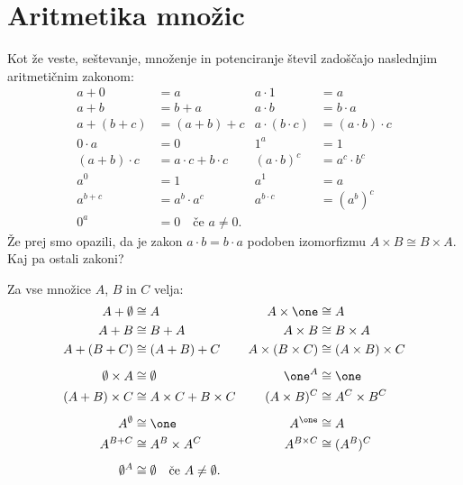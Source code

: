 
\section{Aritmetika množic}
\label{sec:aritmetika-mnozic}

Kot že veste, seštevanje, množenje in potenciranje števil zadoščajo naslednjim
aritmetičnim zakonom:
%
\begin{align*}
  a + 0 &= a                   &     a \cdot 1 &= a \\
  a + b &= b + a               &     a \cdot b &= b \cdot a \\
  a + (b + c) &= (a + b) + c   &     a \cdot (b \cdot c) &= (a \cdot b) \cdot c \\[1ex]
  0 \cdot a &= 0                           &   1^a &= 1 \\
  (a + b) \cdot c &= a \cdot c + b \cdot c &   (a \cdot b)^c &= a^c \cdot b^c \\[1ex]
  a^0 &= 1                     &   a^1 &= a \\
  a^{b + c} &= a^b \cdot a^c   &   a^{b \cdot c} &= (a^b)^c \\[1ex]
  0^a &= 0 \quad \text{če $a \neq 0$.}
\end{align*}
%
Že prej smo opazili, da je zakon $a \cdot b = b \cdot a$ podoben izomorfizmu
$A \times B \cong B \times A$. Kaj pa ostali zakoni?

\begin{izrek}
  \label{izrek:aritmetika-mnozic}
  Za vse množice $A$, $B$ in $C$ velja:
  \begin{align*}
    A + \emptyset &\cong A                   &     A \times \one &\cong A \\
    A + B &\cong B + A               &     A \times B &\cong B \times A \\
    A + (B + C) &\cong (A + B) + C   &     A \times (B \times C) &\cong (A \times B) \times C \\[1ex]
    \emptyset \times A &\cong \emptyset                           &   \one^A &\cong \one \\
    (A + B) \times C &\cong A \times C + B \times C &   (A \times B)^C &\cong A^C \times B^C \\[1ex]
    A^\emptyset &\cong \one                     &   A^\one &\cong A \\
    A^{B + C} &\cong A^B \times A^C   &   A^{B \times C} &\cong (A^B)^C \\[1ex]
    \emptyset^A &\cong \emptyset \quad \text{če $A \neq \emptyset$.}
  \end{align*}
\end{izrek}

